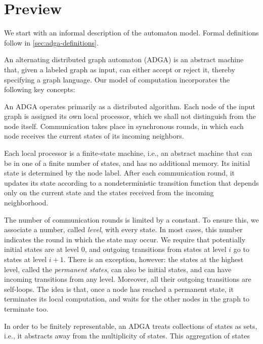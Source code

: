 \documentclass[a4paper,11pt,twoside]{report} \pdfoutput=1
\begin{document}
\section{Preview} \label{sec:adga-preview}
We start with an informal description of the automaton model. Formal
definitions follow in \cref{sec:adga-definitions}.

An alternating distributed graph automaton (ADGA) is an abstract
machine that, given a labeled graph as input, can either accept or
reject it, thereby specifying a graph language. Our model of
computation incorporates the following key concepts:
\begin{description}[style=nextline]
\item[Synchronous Distributed Algorithm.] An ADGA operates primarily
  as a distributed algorithm. Each node of the input graph is assigned
  its own local processor, which we shall not distinguish from the
  node itself. Communication takes place in synchronous rounds, in
  which each node receives the current states of its incoming
  neighbors.
\item[Finite-State Machines.] Each local processor is a finite-state
  machine, i.e., an abstract machine that can be in one of a finite
  number of states, and has no additional memory. Its initial state is
  determined by the node label. After each communication round, it
  updates its state according to a nondeterministic transition
  function that depends only on the current state and the states
  received from the incoming neighborhood.
\item[Constant Running Time.] The number of communication rounds is
  limited by a constant. To ensure this, we associate a number, called
  \emph{level}, with every state. In most cases, this number indicates
  the round in which the state may occur. We require that potentially
  initial states are at level $0$, and outgoing transitions from
  states at level $i$ go to states at level $i+1$. There is an
  exception, however: the states at the highest level, called the
  \emph{permanent states}, can also be initial states, and can have
  incoming transitions from any level. Moreover, all their outgoing
  transitions are self-loops. The idea is that, once a node has
  reached a permanent state, it terminates its local computation, and
  waits for the other nodes in the graph to terminate too.
\item[Aggregation of States.] In order to be finitely representable,
  an ADGA treats collections of states as sets, i.e., it abstracts
  away from the multiplicity of states. This aggregation of states

\end{description}
\end{document}
